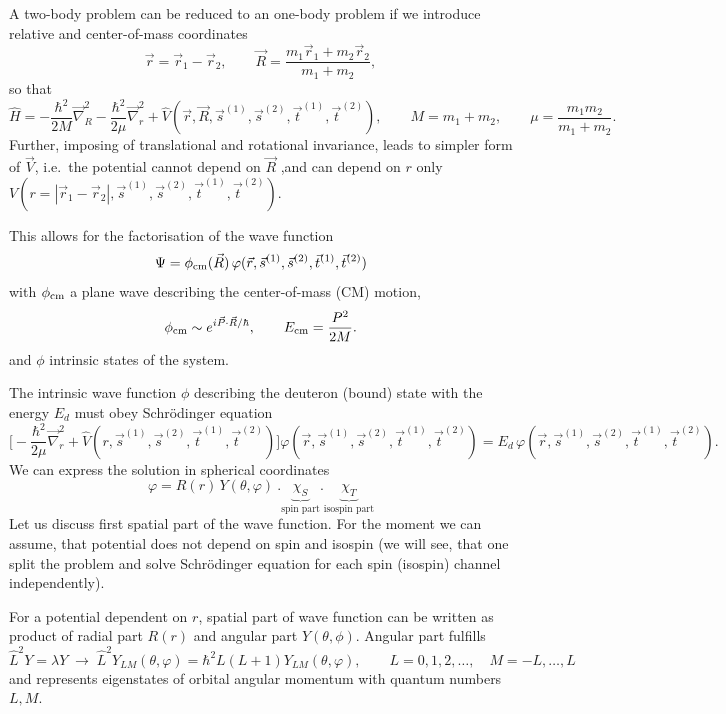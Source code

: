 \documentclass[11pt,a4paper]{article}
\newcommand{\op}[1]{\hat{#1}}
\begin{document}
A two-body problem can be reduced to an one-body problem if we introduce relative and center-of-mass coordinates
\[
\vec r=\vec r_1-\vec r_2, \qquad
\vec R=\frac{m_1\vec r_1+m_2\vec r_2}{m_1+m_2},
\]
so that
\[
\op H=-\frac{\hbar^2}{2M}\vec\nabla_R^2-\frac{\hbar^2}{2\mu}\vec\nabla_r^2
+\op V(\vec r,\vec R,\vec s^{(1)},\vec s^{(2)},\vec t^{(1)},\vec t^{(2)}),
\qquad M=m_1+m_2,\qquad \mu=\frac{m_1 m_2}{m_1+m_2}.
\]
Further, imposing of translational and rotational invariance, leads to simpler form of $\vec V$, i.e.\ the potential cannot depend on $\vec R$ ,and can depend on $r$ only
$V( r = |\vec r_1-\vec r_2|,\vec s^{(1)},\vec s^{(2)},\vec t^{(1)},\vec t^{(2)})$.

This allows for the factorisation of the wave function
\[
\Psi=\phi_{\rm cm}(\vec R)\,\varphi(\vec r,\vec s^{(1)},\vec s^{(2)},\vec t^{(1)},\vec t^{(2)})
\]
with $\phi_{\rm cm}$ a plane wave describing the center-of-mass (CM) motion,
\[
\phi_{\rm cm}\sim e^{i\vec P\cdot\vec R/\hbar},\qquad
E_{\rm cm}=\frac{P^2}{2M}.
\]
and $\phi$ intrinsic states of the system.

The intrinsic wave function $\phi$ describing  the deuteron (bound) state with the energy $E_d$ must obey Schr\"odinger equation
\begin{equation}
\nonumber
\Big[-\frac{\hbar^2}{2\mu}\vec\nabla_r^2+
\op V( r ,\vec s^{(1)},\vec s^{(2)},\vec t^{(1)},\vec t^{(2)})
\Big]
\varphi(\vec r,\vec s^{(1)},\vec s^{(2)},\vec t^{(1)},\vec t^{(2)})
=E_d\,\varphi(\vec r,\vec s^{(1)},\vec s^{(2)},\vec t^{(1)},\vec t^{(2)}).
\end{equation}
We can express the solution in spherical coordinates
\[
\varphi=R(r)\,Y(\theta,\varphi)\ . \underbrace{\chi_S}_{\text{spin part}} . \underbrace{\chi_T}_{\text{isospin part}}
\]
Let us discuss first spatial part of the wave function. For the moment we can assume, that potential does not depend on spin and isospin (we will see, that one split the problem and solve Schr\"odinger equation for each spin (isospin) channel independently). 

For a potential dependent on $r$, spatial part of wave function can be written as product of radial part $R(r)$ and angular part $Y(\theta, \phi)$. Angular part fulfills
\[
\op L^2 Y=\lambda Y \;\to\; \op L^2 Y_{LM}(\theta,\varphi)=\hbar^2 L(L+1)Y_{LM}(\theta,\varphi),
\qquad L=0,1,2,\dots,\quad M=-L,\dots,L
\]
and represents eigenstates of orbital angular momentum with quantum numbers $L,M$. 
\end{document}
